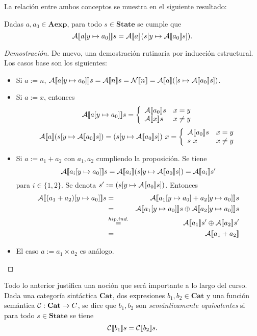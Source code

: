 La relación entre ambos conceptos se muestra en el siguiente resultado:
\begin{lema}
Dadas $a, a_0 \in \mathbf{Aexp}$, para todo $s \in \mathbf{State}$ se cumple que $$\mathcal{A}[\![a[y\mapsto a_0]]\!]s = \mathcal{A}[\![a]\!](s[y\mapsto \mathcal{A}[\![a_0]\!]s]).$$
\end{lema}
\begin{proof}[Demostración]
De nuevo, una demostración rutinaria por inducción estructural. Los casos base son los siguientes:
\begin{itemize}
    \item Si $a := n$, $\fc{A}{a[y\mapsto a_0]}s =  \fc{A}{n}s = \fc{N}{n} = \fc{A}{a}([s\mapsto \fc{A}{a_0}s])$.
    \item Si $a:= x$, entonces
    \[
        \mathcal{A}[\![a[y\mapsto a_0]]\!]s = \left\{\begin{array}{ll}
            \mathcal{A}[\![a_0]\!]s & x=y \\
            \mathcal{A}[\![x]\!]s & x\neq y
        \end{array}\right.
    \]
    $$
        \fc{A}{a}(s[y\mapsto \fc{A}{a_0}s]) = (s[y\mapsto \fc{A}{a_0}s])\ x = \left\{ \begin{array}{ll}
             \fc{A}{a_0}s & x=y \\
             s\ x & x\neq y
        \end{array}\right.
    $$
    \item Si $a := a_1 + a_2$ con $a_1,a_2$ cumpliendo la proposición. Se tiene 
    \[
        \fc{A}{a_i[y\mapsto a_0]}s = \fc{A}{a_i}(s[y\mapsto \fc{A}{a_0}s]) =
        \fc{A}{a_i}s' 
    \]
    para $i\in\{1, 2\}$. Se denota $s' := (s[y\mapsto \mathcal{A}[\![a_0]\!]s])$.
    Entonces
    \begin{eqnarray*}
        \fc{A}{(a_1+a_2)[y\mapsto a_0]}s &=&
        \fc{A}{a_1[y\mapsto a_0]+a_2[y\mapsto a_0]}s  \\
        &=& \fc{A}{a_1[y\mapsto a_0]}s\oplus\fc{A}{a_2[y\mapsto a_0]}s \\
        &\overset{hip.ind.}{=}& \fc{A}{a_1}s' \oplus\fc{A}{a_2}s' \\
        &=& \fc{A}{a_1+a_2}
    \end{eqnarray*}
    \item El caso $a := a_1 \times a_2$ es análogo.
\end{itemize}
\end{proof}


Todo lo anterior justifica una noción que será importante a lo largo del curso. Dada una categoría sintáctica $\textbf{Cat}$, dos expresiones $b_1, b_2 \in \textbf{Cat}$ y una función semántica $\mathcal{C}: \textbf{Cat}\rightarrow C$, se dice que $b_1, b_2$ son \textit{semánticamente equivalentes} si para todo $s\in \textbf{State}$ se tiene
\[
    \mathcal{C}[\![b_1]\!]s = \mathcal{C}[\![b_2]\!]s.
\]
